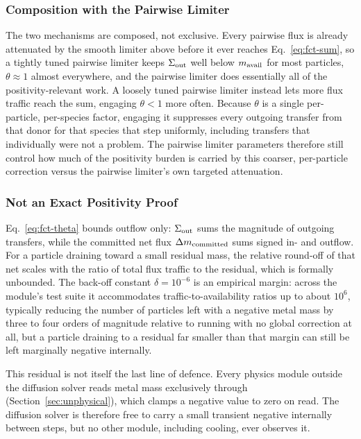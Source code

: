 \documentclass[11pt, a4paper, parskip]{scrartcl}
\newcommand{\code}[1]{\texttt{\seqsplit{#1}}}
\theoremstyle{plain}
\theoremstyle{definition}
\begin{document}
\subsubsection{Composition with the Pairwise Limiter}
The two mechanisms are composed, not exclusive. Every pairwise flux is
already attenuated by the smooth limiter above before it ever reaches
Eq.~\eqref{eq:fct-sum}, so a tightly tuned pairwise limiter keeps
$\Sigma_{\rm out}$ well below $m_{\rm avail}$ for most particles,
$\theta\approx 1$ almost everywhere, and the pairwise limiter does
essentially all of the positivity-relevant work. A loosely tuned pairwise
limiter instead lets more flux traffic reach the sum, engaging $\theta<1$
more often. Because $\theta$ is a single per-particle, per-species factor,
engaging it suppresses every outgoing transfer from that donor for that
species that step uniformly, including transfers that individually were
not a problem. The pairwise limiter parameters therefore still control how
much of the positivity burden is carried by this coarser, per-particle
correction versus the pairwise limiter's own targeted attenuation.

\subsubsection{Not an Exact Positivity Proof}
Eq.~\eqref{eq:fct-theta} bounds outflow only: $\Sigma_{\rm out}$ sums the
magnitude of outgoing transfers, while the committed net flux
$\Delta m_{\rm committed}$ sums signed in- and outflow. For a particle
draining toward a small residual mass, the relative round-off of that net
scales with the ratio of total flux traffic to the residual, which is
formally unbounded. The back-off constant $\delta=10^{-6}$ is an empirical
margin: across the module's test suite it accommodates
traffic-to-availability ratios up to about $10^{6}$, typically reducing
the number of particles left with a negative metal mass by three to four
orders of magnitude relative to running with no global correction at all,
but a particle draining to a residual far smaller than that margin can
still be left marginally negative internally.

This residual is not itself the last line of defence. Every physics module
outside the diffusion solver reads metal mass exclusively through
\code{chemistry\_get\_part\_corrected\_metal\_mass}
(Section~\ref{sec:unphysical}), which clamps a negative value to zero on
read. The diffusion solver is therefore free to carry a small transient
negative internally between steps, but no other module, including
cooling, ever observes it.
\end{document}
